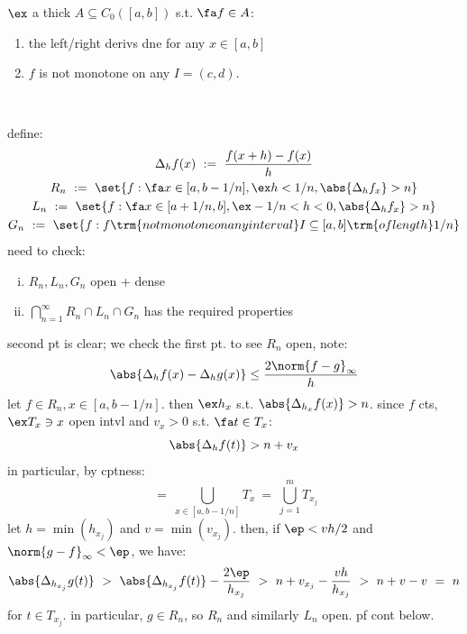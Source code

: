 \begin{prop}
	$\ex$ a thick $A\subseteq C_{0}([a,b])$ s.t. $\fa f\in A$:
	\begin{enumerate}
		\item the left/right derivs dne for any $x\in[a,b]$
		\item $f$ is not monotone on any $I=(c,d)$.
	\end{enumerate}
\end{prop} \

\begin{pf}[source=Primary Source Material]
	define:
	\begin{gather*}
		\Delta_{h}f(x) \ := \ \frac{f(x+h)-f(x)}{h} \\
		R_{n} \ := \ \set{f:\fa x\in[a,b-1/n],\ex h<1/n,\abs{\Delta_{h}f_{x}}>n} \\
		L_{n} \ := \ \set{f:\fa x\in[a+1/n,b],\ex -1/n<h<0,\abs{\Delta_{h}f_{x}}>n} \\
		G_{n} \ := \ \set{f: f \trm{ not monotone on any interval } I\subseteq[a,b] \trm{ of length } 1/n}
	\end{gather*}
	need to check:
	\begin{enumerate}[i)]
		\item $R_{n},L_{n},G_{n}$ open + dense
		\item $\bigcap_{n=1}^{\infty}R_{n}\cap L_{n}\cap G_{n}$ has the required properties
	\end{enumerate}
	second pt is clear; we check the first pt.
	to see $R_{n}$ open, note:
	\begin{equation*}
		\abs{\Delta_{h}f(x)-\Delta_{h}g(x)}\leq\frac{2\norm{f-g}_{\infty}}{h}
	\end{equation*}
	let $f\in R_{n},x\in[a,b-1/n]$. then $\ex h_{x}$ s.t. $\abs{\Delta_{h_{x}}f(x)}>n$.
	since $f$ cts, $\ex T_{x}\ni x$ open intvl and $v_{x}>0$ s.t. $\fa t\in T_{x}$:
	\begin{equation*}
		\abs{\Delta_{h}f(t)}>n+v_{x}
	\end{equation*}
	in particular, by cptness:
	\begin{equation*}
		[a,b-1/n] \ = \ \bigcup_{x\in[a,b-1/n]}T_{x} \ = \ \bigcup_{j=1}^{m}T_{x_{j}}
	\end{equation*}
	let $h=\min(h_{x_{j}})$ and $v=\min(v_{x_{j}})$.
	then, if $\ep<vh/2$ and $\norm{g-f}_{\infty}<\ep$, we have:
	\begin{equation*}
		\abs{\Delta_{h_{x_{j}}}g(t)} \ > \ \abs{\Delta_{h_{x_{j}}}f(t)}-\frac{2\ep}{h_{x_{j}}}
		\ > \ n+v_{x_{j}}-\frac{vh}{h_{x_{j}}} \ > \ n+v-v \ = \ n
	\end{equation*}
	for $t\in T_{x_{j}}$. in particular, $g\in R_{n}$, so $R_{n}$ and similarly $L_{n}$ open.
	pf cont below.
\end{pf}

